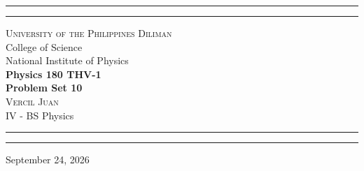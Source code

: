 \begin{titlepage}
    \vspace*{2.5in}
    \hrule
    \vspace{3pt}
    \hrule
    \vspace{0.25in}
    \begin{center}
		{
			\Large 
			\textsc{
				University of the Philippines Diliman
			}
			\\[4pt]
			College of Science
			\\[4pt]
			National Institute of Physics
		}
		\\[0.5cm]
		{
			\Huge
			\textbf{
				Physics 180 THV-1
				\\[5pt]
				Problem Set 10
			}
		}
		\\[0.75cm]
		{
			\Large 
			\textsc{
				Vercil Juan
			}
		}\\[5pt] 
		{
			\large 
			IV - BS Physics
		}
    \end{center}
    \vspace{0.25in}
    \hrule
    \vspace{3pt}
    \hrule 
    \vfill
    \begin{center}
    {\large 
		September 24, 2026
	}
    \end{center}
\end{titlepage}
